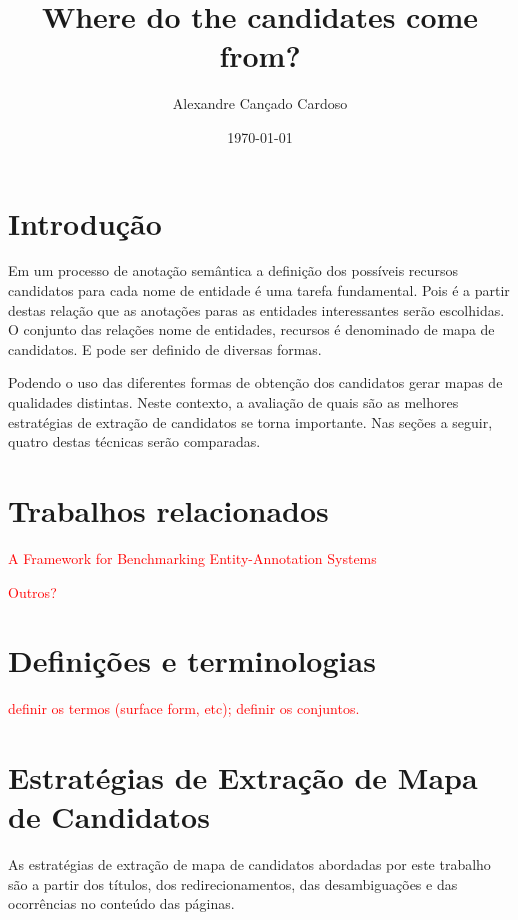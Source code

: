 \documentclass[10pt,a4paper]{llncs}
\title{Where do the candidates come from?}
\author{Alexandre Cançado Cardoso}
\institute{UFJF}
\date{\today}
\begin{document}
\maketitle


\section{Introdução} \label{introducao}
 Em um processo de anotação semântica a definição dos possíveis recursos candidatos para cada nome de entidade é uma tarefa fundamental. Pois é a partir destas relação que as anotações paras as entidades interessantes serão escolhidas. O conjunto das relações nome de entidades, recursos é denominado de mapa de candidatos. E pode ser definido de diversas formas.

Podendo o uso das diferentes formas de obtenção dos candidatos gerar mapas de qualidades distintas. Neste contexto, a avaliação de quais são as melhores estratégias de extração de candidatos se torna importante. Nas seções a seguir, quatro destas técnicas serão comparadas.



\section{Trabalhos relacionados}\label{related}
\textcolor{red}{A Framework for Benchmarking Entity-Annotation Systems}

\textcolor{red}{Outros?}



\section{Definições e terminologias}
\textcolor{red}{definir os termos (surface form, etc); definir os conjuntos.}

\section{Estratégias de Extração de Mapa de Candidatos} \label{extracao-mapa-candidatos}
\indent\indent As estratégias de extração de mapa de candidatos abordadas por este trabalho são a partir dos títulos, dos redirecionamentos, das desambiguações e das ocorrências no conteúdo das páginas.
\end{document}
